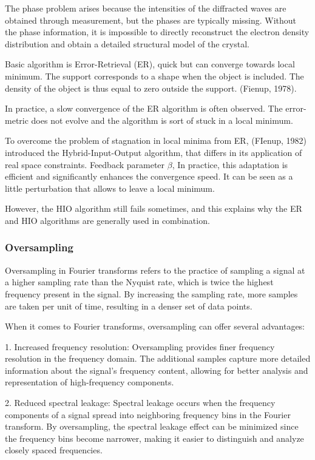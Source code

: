 The phase problem arises because the intensities of the diffracted waves are obtained through measurement, but the phases are typically missing. Without the phase information, it is impossible to directly reconstruct the electron density distribution and obtain a detailed structural model of the crystal.

Basic algorithm is Error-Retrieval (ER), quick but can converge towards local minimum. 
The support corresponds to a shape when the object is included. The density of the object is thus equal to zero outside the support. (Fienup, 1978).

In practice, a slow convergence of the ER algorithm is often observed. The error-metric does not evolve and the algorithm is sort of stuck in a local minimum.

To overcome the problem of stagnation in local minima from ER, (FIenup, 1982) introduced the Hybrid-Input-Output algorithm, that differs in its application of real space constraints. Feedback parameter $\beta$, 
In practice, this adaptation is efficient and significantly enhances the convergence speed. It can be seen as a little perturbation that allows to leave a local minimum.


However, the HIO algorithm still fails sometimes, and this explains why the ER and HIO algorithms are generally used in combination.

\subsubsection{Oversampling}
Oversampling in Fourier transforms refers to the practice of sampling a signal at a higher sampling rate than the Nyquist rate, which is twice the highest frequency present in the signal. By increasing the sampling rate, more samples are taken per unit of time, resulting in a denser set of data points.

When it comes to Fourier transforms, oversampling can offer several advantages:

1. Increased frequency resolution: Oversampling provides finer frequency resolution in the frequency domain. The additional samples capture more detailed information about the signal's frequency content, allowing for better analysis and representation of high-frequency components.

2. Reduced spectral leakage: Spectral leakage occurs when the frequency components of a signal spread into neighboring frequency bins in the Fourier transform. By oversampling, the spectral leakage effect can be minimized since the frequency bins become narrower, making it easier to distinguish and analyze closely spaced frequencies.

